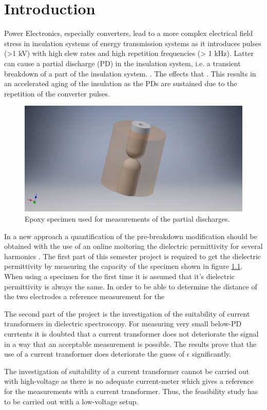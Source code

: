 
\chapter{Introduction}
Power Electronics, especially converters, lead to a more complex electrical field stress in insulation systems of energy transmission systems as it introduces pulses (>1 kV) with high slew rates and high repetition frequencies (> 1 kHz). Latter can cause a partial discharge (PD) in the insulation system, i.e. a transient breakdown of a part of the insulation system. \cite{TransformerEngineering}. The effects that . This results in an accelerated aging of the insulation as the PDs are sustained due to the repetition of the converter pulses. 
\newline


\begin{figure}
\includegraphics[width=\textwidth]{figures/intro/epoxy_specimen.jpg}
	\caption{Epoxy specimen used for measurements of the partial discharges.}
	\label{fig.specimen}
\end{figure}
In a new approach a quantification of the pre-breakdown modification should be obtained with the use of an online moitoring the dielectric permittivity for several harmonics \cite{FaerberMVISS}.
The first part of this semester project is required to get the dielectric permittivity by measuring the capacity of the specimen shown in figure \ref{fig.specimen}. When using a specimen for the first time it is assumed that it's dielectric permittivity is always the same. In order to be able to determine the distance of the two electrodes a reference measurement for the 

The second part of the project is the investigation of the suitability of current transformers in dielectric spectroscopy. For measuring very small below-PD currtents it is doubted that a current transformer does not deteriorate the signal in a way that an acceptable measurement is possible. The results prove that the use of a current transformer does deteriorate the guess of $\epsilon$ significantly. 

The investigation of suitability of a current transformer cannot be carried out with high-voltage as there is no adequate current-meter which gives a reference for the measurements with a current transformer. Thus, the feasibility study has to be carried out with a low-voltage setup. 


